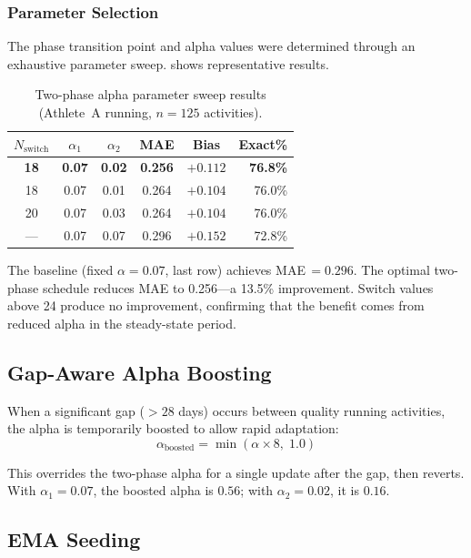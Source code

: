 \documentclass[11pt,a4paper]{article}
\begin{document}
\subsubsection{Parameter Selection}

The phase transition point and alpha values were determined through an exhaustive parameter sweep.
 shows representative results.

\begin{table}[H]
\centering
\caption{Two-phase alpha parameter sweep results (Athlete~A running, $n = 125$ activities).}
\label{tab:alpha-sweep}
\begin{tabular}{@{}cccccr@{}}
\toprule
$N_{\text{switch}}$ & $\alpha_1$ & $\alpha_2$ & \textbf{MAE} & \textbf{Bias} & \textbf{Exact\%} \\
\midrule
\textbf{18} & \textbf{0.07} & \textbf{0.02} & \textbf{0.256} & $\boldsymbol{+0.112}$ & \textbf{76.8\%} \\
18 & 0.07 & 0.01 & 0.264 & $+0.104$ & 76.0\% \\
20 & 0.07 & 0.03 & 0.264 & $+0.104$ & 76.0\% \\
--- & 0.07 & 0.07 & 0.296 & $+0.152$ & 72.8\% \\
\bottomrule
\end{tabular}
\end{table}

The baseline (fixed $\alpha = 0.07$, last row) achieves MAE\,$= 0.296$.
The optimal two-phase schedule reduces MAE to 0.256---a 13.5\% improvement.
Switch values above 24 produce no improvement, confirming that the benefit comes from reduced alpha in the steady-state period.


\subsection{Gap-Aware Alpha Boosting}
\label{sec:gap-boost}

When a significant gap ($> 28$ days) occurs between quality running activities, the alpha is temporarily boosted to allow rapid adaptation:
\begin{equation}
\alpha_{\text{boosted}} = \min(\alpha \times 8,\; 1.0)
\label{eq:gap-boost}
\end{equation}

This overrides the two-phase alpha for a single update after the gap, then reverts.
With $\alpha_1 = 0.07$, the boosted alpha is $0.56$; with $\alpha_2 = 0.02$, it is $0.16$.


\subsection{EMA Seeding}
\label{sec:seeding}
\end{document}
